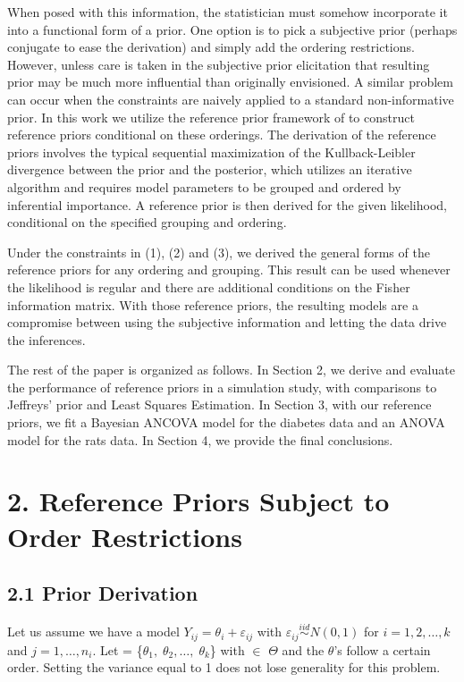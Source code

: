 \documentclass[Proceedings]{ascelike}
\begin{document}
When posed with this information, the statistician must somehow
incorporate it into a functional form of a prior. One option is to
pick a subjective prior (perhaps conjugate to ease the derivation) and
simply add the ordering restrictions. However, unless care is taken in
the subjective prior elicitation that resulting prior may be much more
influential than originally envisioned. A similar problem can occur
when the constraints are naively applied to a standard non-informative
prior. In this work we utilize the reference prior framework of
\cite{BergerBernardo1992} to construct reference priors conditional on
these orderings. The derivation of the reference priors involves the
typical sequential maximization of the Kullback-Leibler divergence
between the prior and the posterior, which utilizes an iterative
algorithm and requires model parameters to be grouped and ordered by
inferential importance. A reference prior is then derived for the
given likelihood, conditional on the specified grouping and ordering.

Under the constraints in (1), (2) and (3), we derived the general
forms of the reference priors for any ordering and grouping. This
result can be used whenever the likelihood is regular and there are
additional conditions on the Fisher information matrix. With those
reference priors, the resulting models are a compromise between using
the subjective information and letting the data drive the inferences.

The rest of the paper is organized as follows. In Section 2, we derive
and evaluate the performance of reference priors in a simulation
study, with comparisons to Jeffreys' prior and Least Squares
Estimation. In Section 3, with our reference priors, we fit a Bayesian
ANCOVA model for the diabetes data and an ANOVA model for the rats
data. In Section 4, we provide the final conclusions.

\section{2. Reference Priors Subject to Order Restrictions}
\subsection{2.1 Prior Derivation}
Let us assume we have a model $Y_{ij}=\theta_i + \varepsilon_{ij}$
with $\varepsilon_{ij}\overset{iid}{\sim}N(0,1)$ for $i = 1, 2,
\hdots, k$ and $j = 1, \hdots, n_i.$ Let \pmb{$\theta$} =
\{$\theta_1,\;\theta_2,\hdots,\;\theta_k$\} with \pmb{$\theta$} $\in$
$\Theta$ and the $\theta$'s follow a certain order. Setting the
variance equal to 1 does not lose generality for this problem.
\end{document}
